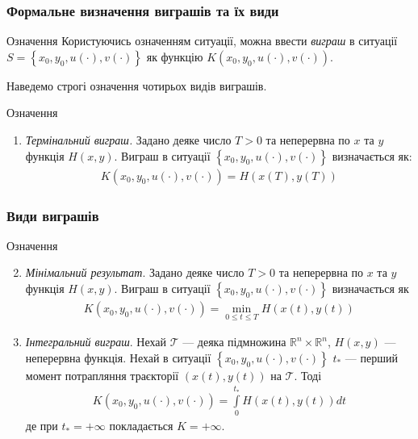 \documentclass[10pt,pdf,aspectratio=169]{beamer}
\newcommand{\R}{\mathbb{R}}
\newcommand{\T}{\mathcal{T}}
\renewcommand{\l}{\left}
\renewcommand{\r}{\right}
\newcommand{\intl}{\int\limits}
\begin{document}
    \begin{frame}
        \frametitle{Формальне визначення виграшів та їх види}

        \begin{block}{Означення}
            Користуючись означенням ситуації, можна ввести \emph{виграш} в ситуації $S = \l\{x_0, y_0, u(\cdot), v(\cdot) \r\}$
            як функцію $K(x_0, y_0, u(\cdot), v(\cdot))$.
        \end{block}

        Наведемо строгі означення чотирьох видів виграшів.

        \begin{block}{Означення}
            \begin{enumerate}
                \item \emph{Термінальний виграш.} Задано деяке число $T>0$ та неперервна по $x$ та $y$ функція $H(x, y)$. Виграш в ситуації $\l\{x_0, y_0, u(\cdot), v(\cdot) \r\}$
                визначається як:
                \begin{gather*}
                    K(x_0, y_0, u(\cdot), v(\cdot)) = H(x(T), y(T))
                \end{gather*}
            \end{enumerate}
        \end{block}
    \end{frame}
    \begin{frame}
        \frametitle{Види виграшів}
        
        \begin{block}{Означення}
            \begin{enumerate}
                \setcounter{enumi}{1}
                \item \emph{Мінімальний результат}. Задано деяке число $T>0$ та неперервна по $x$ та $y$ функція $H(x, y)$. Виграш в ситуації $\l\{x_0, y_0, u(\cdot), v(\cdot) \r\}$
                визначається як
                \begin{gather*}
                    K(x_0, y_0, u(\cdot), v(\cdot)) = \underset{0 \leq t \leq T}{\min} H(x(t), y(t))
                \end{gather*}

                \item  \emph{Інтегральний виграш}. Нехай $\T$ --- деяка підмножина $\R^n \times \R^n$, $H(x, y)$ --- неперервна функція. Нехай в ситуації $\l\{x_0, y_0, u(\cdot), v(\cdot) \r\}$
                $t_*$ --- перший момент потрапляння траєкторії $(x(t), y(t))$ на $\T$.
                Тоді
                \begin{gather*}
                    K(x_0, y_0, u(\cdot), v(\cdot)) = \intl_0^{t_*} H(x(t), y(t)) dt
                \end{gather*}
                де при $t_* = +\infty$ покладається $K = +\infty$.

            \end{enumerate}
        \end{block}
    
    \end{frame}
\end{document}
